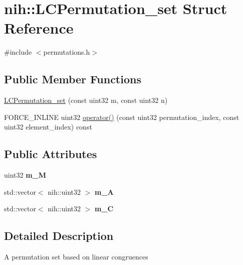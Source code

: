 \hypertarget{structnih_1_1_l_c_permutation__set}{
\section{nih\-:\-:\-L\-C\-Permutation\-\_\-set \-Struct \-Reference}
\label{structnih_1_1_l_c_permutation__set}
}


{\ttfamily \#include $<$permutations.\-h$>$}

\subsection*{\-Public \-Member \-Functions}
\begin{DoxyCompactItemize}
\item 
\hyperlink{structnih_1_1_l_c_permutation__set_a27bf54daea4b2ec9fef4dee8b040be09}{\-L\-C\-Permutation\-\_\-set} (const uint32 m, const uint32 n)
\item 
\-F\-O\-R\-C\-E\-\_\-\-I\-N\-L\-I\-N\-E uint32 \hyperlink{structnih_1_1_l_c_permutation__set_aa9b83972db397ad57e2d0ee55b5e7322}{operator()} (const uint32 permutation\-\_\-index, const uint32 element\-\_\-index) const 
\end{DoxyCompactItemize}
\subsection*{\-Public \-Attributes}
\begin{DoxyCompactItemize}
\item 
\hypertarget{structnih_1_1_l_c_permutation__set_a83c1fe552156c418b291a66c9cda7bef}{
uint32 {\bfseries m\-\_\-\-M}}
\label{structnih_1_1_l_c_permutation__set_a83c1fe552156c418b291a66c9cda7bef}

\item 
\hypertarget{structnih_1_1_l_c_permutation__set_ae8d3a78b024dc5e808b907af93b799e8}{
std\-::vector$<$ nih\-::uint32 $>$ {\bfseries m\-\_\-\-A}}
\label{structnih_1_1_l_c_permutation__set_ae8d3a78b024dc5e808b907af93b799e8}

\item 
\hypertarget{structnih_1_1_l_c_permutation__set_a0ce48c3b715e7e8e4415b797efc3918b}{
std\-::vector$<$ nih\-::uint32 $>$ {\bfseries m\-\_\-\-C}}
\label{structnih_1_1_l_c_permutation__set_a0ce48c3b715e7e8e4415b797efc3918b}

\end{DoxyCompactItemize}


\subsection{\-Detailed \-Description}
\-A permutation set based on linear congruences 

